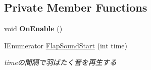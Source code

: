 \subsection*{Private Member Functions}
\begin{DoxyCompactItemize}
\item 
\mbox{\label{class_bat_a3120c9dbb1f0228dfa50e994be48334a}} 
void {\bfseries On\+Enable} ()
\item 
I\+Enumerator \hyperlink{class_bat_a84946382d9226014374a238b1d08cff4}{Flap\+Sound\+Start} (int time)
\begin{DoxyCompactList}\small\item\em timeの間隔で羽ばたく音を再生する \end{DoxyCompactList}\end{DoxyCompactItemize}
